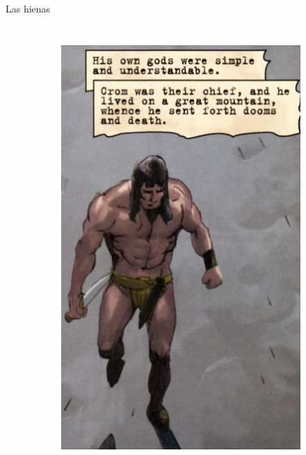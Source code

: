\begin{frame}{Las hienas}
\begin{columns}
\begin{figure}[htp]
\begin{subfigure}[b]{0.27\textwidth}
				\includegraphics[width=\textwidth]{img/conan/DH}
			\end{subfigure}
			~
			\begin{subfigure}[b]{0.23\textwidth}

\end{subfigure}
\end{figure}
\end{columns}
\end{frame}
